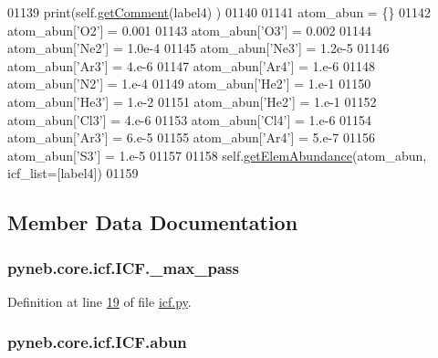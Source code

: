 \begin{DoxyCode}
01139         print(self.\hyperlink{classpyneb_1_1core_1_1icf_1_1_i_c_f_a3bf3857377fc4d8b7609423a2ff26345}{getComment}(label4) )
01140 
01141         atom\_abun = \{\}
01142         atom\_abun[\textcolor{stringliteral}{'O2'}] = 0.001
01143         atom\_abun[\textcolor{stringliteral}{'O3'}] = 0.002
01144         atom\_abun[\textcolor{stringliteral}{'Ne2'}] = 1.0e-4
01145         atom\_abun[\textcolor{stringliteral}{'Ne3'}] = 1.2e-5
01146         atom\_abun[\textcolor{stringliteral}{'Ar3'}] = 4.e-6
01147         atom\_abun[\textcolor{stringliteral}{'Ar4'}] = 1.e-6
01148         atom\_abun[\textcolor{stringliteral}{'N2'}] = 1.e-4
01149         atom\_abun[\textcolor{stringliteral}{'He2'}] = 1.e-1
01150         atom\_abun[\textcolor{stringliteral}{'He3'}] = 1.e-2
01151         atom\_abun[\textcolor{stringliteral}{'He2'}] = 1.e-1
01152         atom\_abun[\textcolor{stringliteral}{'Cl3'}] = 4.e-6
01153         atom\_abun[\textcolor{stringliteral}{'Cl4'}] = 1.e-6
01154         atom\_abun[\textcolor{stringliteral}{'Ar3'}] = 6.e-5
01155         atom\_abun[\textcolor{stringliteral}{'Ar4'}] = 5.e-7
01156         atom\_abun[\textcolor{stringliteral}{'S3'}] = 1.e-5
01157 
01158         self.\hyperlink{classpyneb_1_1core_1_1icf_1_1_i_c_f_a30b52d6d1ec148fba7c0a15cad653f61}{getElemAbundance}(atom\_abun, icf\_list=[label4])
01159 
\end{DoxyCode}


\subsection{Member Data Documentation}
\hypertarget{classpyneb_1_1core_1_1icf_1_1_i_c_f_a994574a4b1fff9d0700fb483dabc8238}{
\subsubsection[{\-\_\-max\-\_\-pass}]{\setlength{\rightskip}{0pt plus 5cm}pyneb.\-core.\-icf.\-I\-C\-F.\-\_\-max\-\_\-pass\hspace{0.3cm}{\ttfamily [private]}}}\label{classpyneb_1_1core_1_1icf_1_1_i_c_f_a994574a4b1fff9d0700fb483dabc8238}


Definition at line \hyperlink{icf_8py_source_l00019}{19} of file \hyperlink{icf_8py_source}{icf.\-py}.

\hypertarget{classpyneb_1_1core_1_1icf_1_1_i_c_f_a16f31533c8f77e2b08988b22df5317b1}{
\subsubsection[{abun}]{\setlength{\rightskip}{0pt plus 5cm}pyneb.\-core.\-icf.\-I\-C\-F.\-abun}}\label{classpyneb_1_1core_1_1icf_1_1_i_c_f_a16f31533c8f77e2b08988b22df5317b1}


